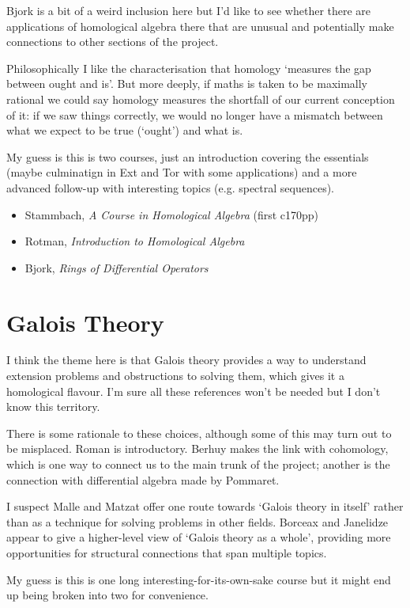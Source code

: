 \documentclass[article]{article}
\begin{document}
Bjork is a bit of a weird inclusion here but I'd like to see whether there are applications of homological algebra there that are unusual and potentially make connections to other sections of the project.

Philosophically I like the characterisation that homology `measures the gap between ought and is'. But more deeply, if maths is taken to be maximally rational we could say homology measures the shortfall of our current conception of it: if we saw things correctly, we would no longer have a mismatch between what we expect to be true (`ought') and what is.

My guess is this is two courses, just an introduction covering the essentials (maybe culminatign in Ext and Tor with some applications) and a more advanced follow-up with interesting topics (e.g. spectral sequences).

\begin{itemize}
	\item[]{Stammbach, \textit{A Course in Homological Algebra} (first c170pp)}
	\item[]{Rotman, \textit{Introduction to Homological Algebra}}
	\item[]{Bjork, \textit{Rings of Differential Operators}}
\end{itemize}

\section{Galois Theory}

I think the theme here is that Galois theory provides a way to understand extension problems and obstructions to solving them, which gives it a homological flavour. I'm sure all these references won't be needed but I don't know this territory.

There is some rationale to these choices, although some of this may turn out to be misplaced. Roman is introductory. Berhuy makes the link with cohomology, which is one way to connect us to the main trunk of the project; another is the connection with differential algebra made by Pommaret. 

I suspect Malle and Matzat offer one route towards `Galois theory in itself' rather than as a technique for solving problems in other fields. Borceax and Janelidze appear to give a higher-level view of `Galois theory as a whole', providing more opportunities for structural connections that span multiple topics.

My guess is this is one long interesting-for-its-own-sake course but it might end up being broken into two for convenience.
\end{document}
